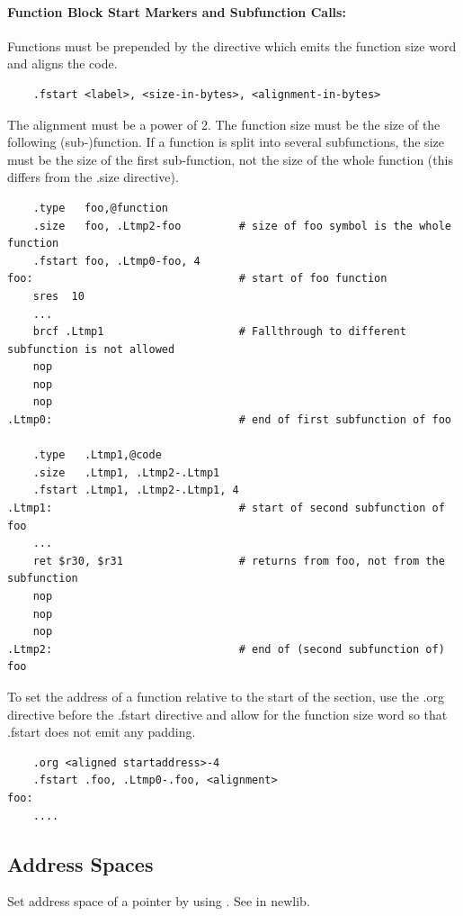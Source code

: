 \paragraph{Function Block Start Markers and Subfunction Calls:}
Functions must be prepended by the  directive which emits the function size word and aligns the
code.

\begin{verbatim}
    .fstart <label>, <size-in-bytes>, <alignment-in-bytes>
\end{verbatim}

The alignment must be a power of 2. The function size must be the size of the following (sub-)function.
If a function is split into several subfunctions, the size must be the size of the first sub-function,
not the size of the whole function (this differs from the .size directive).

\begin{verbatim}
    .type   foo,@function
    .size   foo, .Ltmp2-foo         # size of foo symbol is the whole function
    .fstart foo, .Ltmp0-foo, 4
foo:                                # start of foo function
    sres  10
    ...
    brcf .Ltmp1                     # Fallthrough to different subfunction is not allowed
    nop
    nop
    nop
.Ltmp0:                             # end of first subfunction of foo

    .type   .Ltmp1,@code
    .size   .Ltmp1, .Ltmp2-.Ltmp1
    .fstart .Ltmp1, .Ltmp2-.Ltmp1, 4
.Ltmp1:                             # start of second subfunction of foo
    ...
    ret $r30, $r31                  # returns from foo, not from the subfunction
    nop
    nop
    nop
.Ltmp2:                             # end of (second subfunction of) foo
\end{verbatim}

To set the address of a function relative to the start of the section, use the .org directive before
the .fstart directive and allow for the function size word so that .fstart does not emit any padding.

\begin{verbatim}
    .org <aligned startaddress>-4
    .fstart .foo, .Ltmp0-.foo, <alignment>
foo:
    ....
\end{verbatim}

\subsection{Address Spaces}

Set address space of a pointer by using . See  in newlib.

